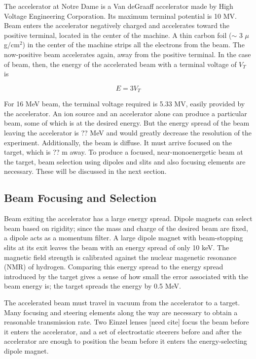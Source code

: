 The accelerator at Notre Dame is a Van deGraaff accelerator made by High Voltage Engineering Corporation.  Its maximum terminal potential is 10 MV.  Beam enters the accelerator negatively charged and accelerates toward the positive terminal, located in the center of the machine. A thin carbon foil ($\sim$ 3 $\mu$g/cm$^2$) in the center of the machine strips all the electrons from the beam.  The now-positive beam accelerates again, away from the positive terminal. In the case of  beam, then, the energy of the accelerated beam with a terminal voltage of $V_T$ is 

\begin{equation}
E = 3V_T
\end{equation}

For 16 MeV  beam, the terminal voltage required is 5.33 MV, easily provided by the accelerator.  An ion source and an accelerator alone can produce a particular beam, some of which is at the desired energy.  But the energy spread of the beam leaving the accelerator is ?? MeV and would greatly decrease the resolution of the experiment.  Additionally, the beam is diffuse.  It must arrive focused on the target, which is ?? m away.  To produce a focused, near-monoenergetic beam at the target, beam selection using dipoles and slits and also focusing elements are necessary.  These will be discussed in the next section.


\subsection{Beam Focusing and Selection}

Beam exiting the accelerator has a large energy spread.  Dipole magnets can select beam based on rigidity; since the mass and charge of the desired beam are fixed, a dipole acts as a momentum filter.  A large dipole magnet with beam-stopping slits at its exit leaves the beam with an energy spread of only 10 keV.  The magnetic field strength is calibrated against the nuclear magenetic resonance (NMR) of hydrogen.  Comparing this energy spread to the energy spread introduced by the target gives a sense of how small the error associated with the beam energy is; the target spreads the energy by 0.5 MeV.

The accelerated beam must travel in vacuum from the accelerator to a target.  Many focusing and steering elements along the way are necessary to obtain a reasonable transmission rate.  Two Einzel lenses [need cite] focus the beam before it enters the accelerator, and a set of electrostatic steerers before and after the accelerator are enough to position the beam before it enters the energy-selecting dipole magnet.

